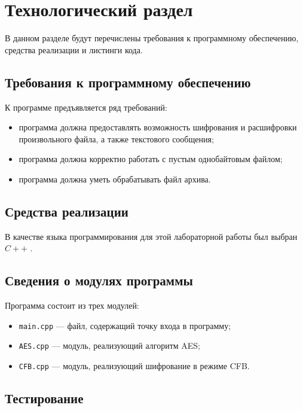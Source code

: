 \chapter{Технологический раздел}

В данном разделе будут перечислены требования к программному обеспечению, средства реализации и листинги кода.

\section{Требования к программному обеспечению}

К программе предъявляется ряд требований:

\begin{itemize} [label=--]
	\item программа должна предоставлять возможность шифрования и расшифровки произвольного файла, а также текстового сообщения;
	\item программа должна корректно работать с пустым однобайтовым файлом;
	\item программа должна уметь обрабатывать файл архива.
\end{itemize}

\section{Средства реализации}

В качестве языка программирования для этой лабораторной работы был выбран $C++$ \cite{pl}.

\section{Сведения о модулях программы}

Программа состоит из трех модулей: 

\begin{itemize}
	\item \texttt{main.cpp} --- файл, содержащий точку входа в программу;
	\item \texttt{AES.cpp} --- модуль, реализующий алгоритм AES;
	\item \texttt{CFB.cpp} --- модуль, реализующий шифрование в режиме CFB.
\end{itemize}

\section{Тестирование}

